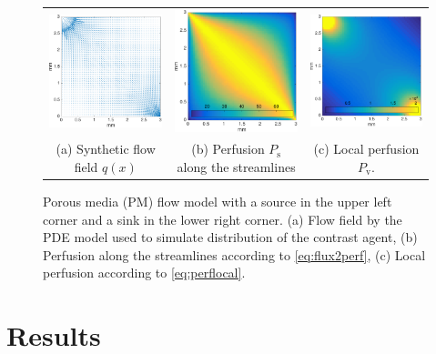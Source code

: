 \documentclass[journal,twocolumn]{IEEEtran}
\newcommand{\Perfv}{P_{\mathrm{v}}}
\newcommand{\Perfs}{P_{\mathrm{s}}}
\begin{document}
\begin{figure}[h!tb]
	\centering
	\begin{tabular}{c c c}
		\includegraphics[width=.3\textwidth]{figs/qmat.pdf} & \includegraphics[width=.3\textwidth]{figs/perfmat.pdf} & \includegraphics[width=.3\textwidth]{figs/lperfmat.pdf}\\
		(a) Synthetic flow field $q(x)$ & (b) Perfusion $\Perfs$ along the streamlines  & (c) Local perfusion $\Perfv$.
	\end{tabular}
	\caption{Porous media (PM) flow model with a source in the upper left corner and a sink in the lower right corner. (a) Flow field by the PDE model used to simulate distribution of the contrast agent, (b) Perfusion along the streamlines according to \eqref{eq:flux2perf}, (c) Local perfusion according to \eqref{eq:perflocal}.}
        \label{fig:flowpressureperfusion}
\end{figure}


	\section{Results}	
\end{document}
